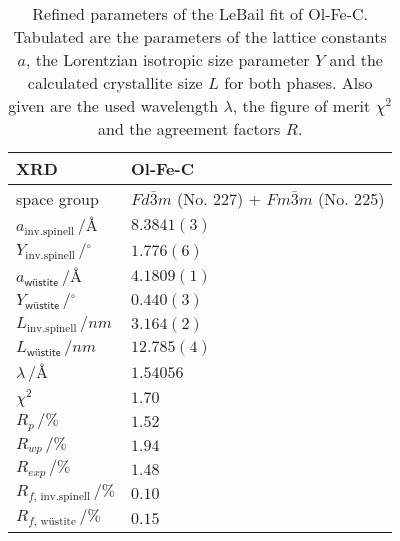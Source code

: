 \documentclass[\main/dresen_thesis.tex]{subfiles}
\begin{document}
  \begin{table}[ht]
    \centering
    \caption{\label{tab:colloidalCrystals:nanoparticle:discussion:xrdLeBail}Refined parameters of the LeBail fit of Ol-Fe-C. Tabulated are the parameters of the lattice constants $a$, the Lorentzian isotropic size parameter $Y$ and the calculated crystallite size $L$ for both phases. Also given are the used wavelength $\lambda$, the figure of merit $\chi^2$ and the agreement factors $R$.}
    \begin{tabular}{ l | l }
      \hline
      \rule{0pt}{2ex} \textbf{XRD} & \textbf{Ol-Fe-C}\\
      \hline
      \hline
      \rule{0pt}{2ex}space group & $Fd\bar{3}m$ (No. 227) + $Fm\bar{3}m$ (No. 225)\\
      \hline
      \rule{0pt}{2ex} $a_\mathrm{inv. spinell} \,/ \unit{\angstrom}$         &  $8.3841(3)$  \\
      \rule{0pt}{2ex} $Y_\mathrm{inv. spinell} \,/ \unit{^\circ}$            &  $1.776 (6)$   \\
      \rule{0pt}{2ex} $a_\textsf{w\"ustite}     \,/ \unit{\angstrom}$        &  $4.1809(1)$  \\
      \rule{0pt}{2ex} $Y_\textsf{w\"ustite}     \,/ \unit{^\circ}$           &  $0.440(3)$   \\
      \hline
      \rule{0pt}{2ex} $L_\mathrm{inv. spinell} \,/ \unit{nm}$                &  $3.164(2)$ \\
      \rule{0pt}{2ex} $L_\textsf{w\"ustite}      \,/ \unit{nm}$              &  $12.785(4)$ \\
      \hline
      \rule{0pt}{2ex} $\lambda \,/ \unit{\angstrom}$                         &  $1.54056$\\
      \hline
      \rule{0pt}{2ex} $\chi^2$                                               &  $1.70$ \\
      \rule{0pt}{2ex} $R_p \,/ \unit{\%}$                                    &  $1.52$ \\
      \rule{0pt}{2ex} $R_{wp} \,/ \unit{\%}$                                 &  $1.94$ \\
      \rule{0pt}{2ex} $R_{exp} \,/ \unit{\%}$                                &  $1.48$ \\
      \rule{0pt}{2ex} $R_{f, \, \mathrm{inv. spinell}} \,/ \unit{\%}$        &  $0.10$ \\
      \rule{0pt}{2ex} $R_{f, \, \text{w\"ustite}} \,/ \unit{\%}$             &  $0.15$ \\
      \hline
    \end{tabular}
  \end{table}
\end{document}
